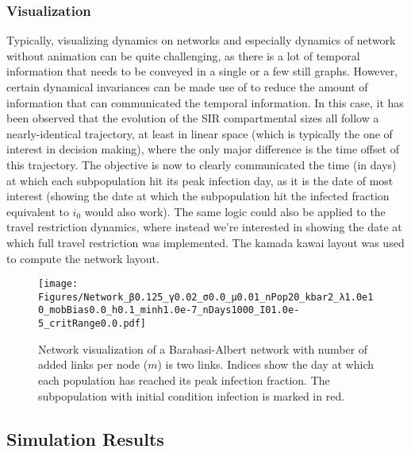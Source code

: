 \subsubsection{Visualization}
Typically, visualizing dynamics on networks and especially dynamics of network without animation can be quite challenging, as there is a lot of temporal information that needs to be conveyed in a single or a few still graphs. However, certain dynamical invariances can be made use of to reduce the amount of information that can communicated the temporal information. In this case, it has been observed that the evolution of the SIR compartmental sizes all follow a nearly-identical trajectory, at least in linear space (which is typically the one of interest in decision making), where the only major difference is the time offset of this trajectory. The objective is now to clearly communicated the time (in days) at which each subpopulation hit its peak infection day, as it is the date of most interest (showing the date at which the subpopulation hit the infected fraction equivalent to $i_0$ would also work). The same logic could also be applied to the travel restriction dynamics, where instead we're interested in showing the date at which full travel restriction was implemented. The kamada kawai layout was used to compute the network layout. 

\begin{figure}[!ht]
    \centering
    \texttt{[image: Figures/Network\_β0.125\_γ0.02\_σ0.0\_μ0.01\_nPop20\_kbar2\_λ1.0e10\_mobBias0.0\_h0.1\_minh1.0e-7\_nDays1000\_I01.0e-5\_critRange0.0.pdf]}
    \caption{\small Network visualization of a Barabasi-Albert network with number of added links per node ($m$) is two links. Indices show the day at which each population has reached its peak infection fraction. The subpopulation with initial condition infection is marked in red.}
    \label{}
\end{figure}

\subsection{Simulation Results}